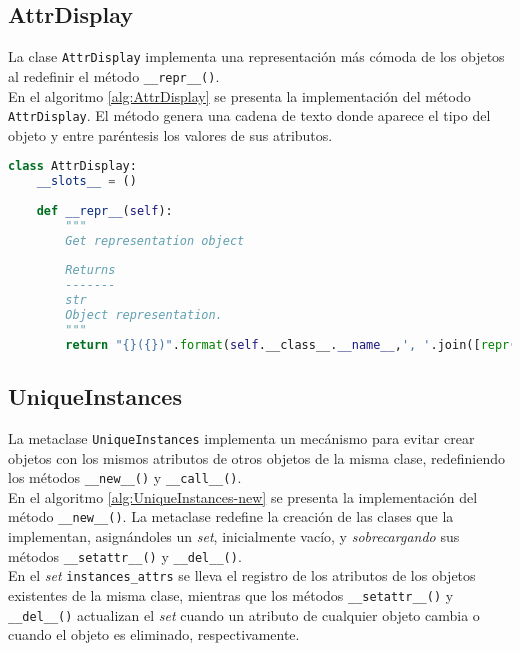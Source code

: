 \subsection{AttrDisplay}

La clase \verb|AttrDisplay| implementa una representación más cómoda de los objetos al redefinir el método \verb|__repr__()|.\\

En el algoritmo \ref{alg:AttrDisplay} se presenta la implementación del método \verb|AttrDisplay|. El método genera una cadena de texto donde aparece el tipo del objeto y entre paréntesis los valores de sus atributos.\\

\begin{lstlisting}[language=Python,caption=Clase \texttt{AttrDisplay} implementada en el archivo \texttt{classtools.py}.,label=alg:AttrDisplay, frame=single]
class AttrDisplay:
    __slots__ = ()
    
    def __repr__(self):
        """
        Get representation object
        
        Returns
        -------
        str
        Object representation.
        """
        return "{}({})".format(self.__class__.__name__,', '.join([repr(getattr(self, name)) for name in self.__slots__]))
\end{lstlisting}
\bigskip

\subsection{UniqueInstances}

La metaclase \verb|UniqueInstances| implementa un mecánismo para evitar crear objetos con los mismos atributos de otros objetos de la misma clase, redefiniendo los métodos \verb|__new__()| y \verb|__call__()|.\\

En el algoritmo \ref{alg:UniqueInstances-new} se presenta la implementación del método \verb|__new__()|. La metaclase redefine la creación de las clases que la implementan, asignándoles un \emph{set}, inicialmente vacío, y \emph{sobrecargando} sus métodos \verb|__setattr__()| y \verb|__del__()|.\\

En el \emph{set} \verb|instances_attrs| se lleva el registro de los atributos de los objetos existentes de la misma clase, mientras que los métodos \verb|__setattr__()| y \verb|__del__()| actualizan el \emph{set} cuando un atributo de cualquier objeto cambia o cuando el objeto es eliminado, respectivamente.\\

